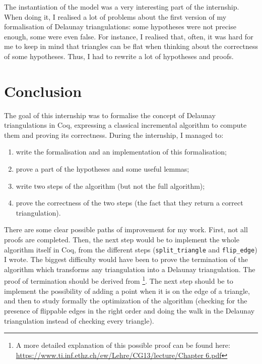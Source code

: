 \documentclass[a4paper,10pt]{article}
\begin{document}
  The instantiation of the model was a very interesting part of the internship. When doing it, I realised a lot of problems about the first version of my formalisation of Delaunay triangulations: some hypotheses were not precise enough, some were even false. For instance, I realised that, often, it was hard for me to keep in mind that triangles can be flat when thinking about the correctness of some hypotheses. Thus, I had to rewrite a lot of hypotheses and proofs.

\section{Conclusion}
The goal of this internship was to formalise the concept of Delaunay triangulations in {\sc Coq}, expressing a classical incremental algorithm to compute them and proving its correctness. During the internship, I managed to:
\begin{enumerate}
\item write the formalisation and an implementation of this formalisation;
\item prove a part of the hypotheses and some useful lemmas;
\item write two steps of the algorithm (but not the full algorithm);
\item prove the correctness of the two steps (the fact that they return a correct triangulation).
\end{enumerate}

There are some clear possible paths of improvement for my work. First, not all proofs are completed. Then, the next step would be to implement the whole algorithm itself in {\sc Coq}, from the different steps ({\tt split\_triangle} and {\tt flip\_edge}) I wrote. The biggest difficulty would have been to prove the termination of the algorithm which transforms any triangulation into a Delaunay triangulation. The proof of termination should be derived from \cite{Bertot}\footnote{A more detailed explanation of this possible proof can be found here:
\href{https://www.ti.inf.ethz.ch/ew/Lehre/CG13/lecture/Chapter 6.pdf}{https://www.ti.inf.ethz.ch/ew/Lehre/CG13/lecture/Chapter 6.pdf}}. The next step should be to implement the possibility of adding a point when it is on the edge of a triangle, and then to study formally the optimization of the algorithm (checking for the presence of flippable edges in the right order and doing the walk in the Delaunay triangulation instead of checking every triangle).
\end{document}
